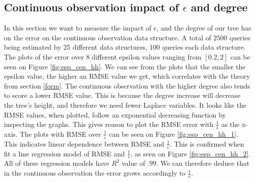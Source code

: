 \documentclass[11pt]{article}
\theoremstyle{definition}
\begin{document}
\newpage \subsection{Continuous observation impact of $\epsilon$ and degree}
In this section we want to measure the impact of $\epsilon$, and the degree of our tree has on the error on the continuous observation data structure. A total of $2500$ queries being estimated by 25 different data structures, 100 queries each data structure. The plots of the error over 8 different epsilon values ranging from $[0.2,2]$ can be seen on Figure \ref{fig:esp_cen_hh}. We can see from the plots that the smaller the epsilon value, the higher an RMSE value we get, which correlates with the theory from section \ref{form}. The continuous observation with the higher degree also tends to score a lower RMSE value. This is because the degree increase will decrease the tree's height, and therefore we need fewer Laplace variables. It looks like the RMSE values, when plotted, follow an exponential decreasing function by inspecting the graphs. This gives reason to plot the RMSE error with  $\frac{1}{\epsilon}$ as the x-axis. The plots with RMSE over $\frac{1}{\epsilon}$ can be seen on Figure \ref{fig:esp_cen_hh_1}. This indicates linear dependence between RMSE and $\frac{1}{\epsilon}$. This is confirmed when fit a line regression model of RMSE and $\frac{1}{\epsilon}$, as seen on Figure \ref{fig:esp_cen_hh_2}. All of these regression models have $R^2$ value of $.99$. We can therefore deduce that in the continuous observation the error grows accordingly to $\frac{1}{\epsilon}$.
\end{document}
